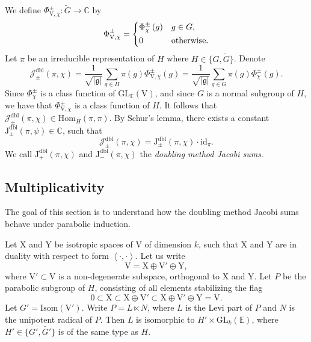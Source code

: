 \documentclass[12pt, reqno]{amsart}
\theoremstyle{definition}
\theoremstyle{definition}
\theoremstyle{definition}
\newcommand{\cComplex}{\mathbb{C}}
\newcommand{\Hom}{\mathrm{Hom}}
\newcommand{\idmap}{\mathrm{id}}
\newcommand{\sizeof}[1]{\left|#1\right|}
\newcommand{\hermitianSpace}{\mathrm{V}}
\newcommand{\xIsotropic}{\mathrm{X}}
\newcommand{\yIsotropic}{\mathrm{Y}}
\newcommand{\innerproduct}[2]{\left\langle #1,#2\right\rangle}
\newcommand{\fieldCharacter}{\psi}
\newcommand{\GL}{\mathrm{GL}}
\newcommand{\GroupExtension}[1]{\widetilde{#1}}
\newcommand{\quadraticExtension}{\mathbb{E}}
\newcommand{\dblJacobiSum}[2]{\mathcal{J}_{\pm}^{\mathrm{dbl}}\left(#1, #2\right)}
\newcommand{\genJacobiKernel}[1]{\Phi^{\pm}_{#1}}
\newcommand{\genHermitianJacobiKernel}[2]{\Phi^{\pm}_{#1,#2}}
\newcommand{\dblJacobiSumScalar}[2]{\mathrm{J}_{\pm}^{\mathrm{dbl}}\left(#1, #2\right)}
\newcommand{\posDblJacobiSumScalar}[2]{\mathrm{J}_{+}^{\mathrm{dbl}}\left(#1, #2\right)}
\newcommand{\negDblJacobiSumScalar}[2]{\mathrm{J}_{-}^{\mathrm{dbl}}\left(#1, #2\right)}
\newcommand{\IsometryGroup}{\mathrm{Isom}}
\newcommand{\lieAlgebra}{\mathfrak{g}}
\begin{document}
We define $\genHermitianJacobiKernel{\hermitianSpace}{\chi} \colon \tilde{G} \to \cComplex$ by $$\genHermitianJacobiKernel{\hermitianSpace}{\chi} =
	\begin{dcases}
		\genJacobiKernel{\chi}\left(g\right) & g \in G,\\
		0 & \text{otherwise.}
	\end{dcases}$$
Let $\pi$ be an irreducible representation of $H$ where $H \in \{G, \GroupExtension{G}\}$. Denote $$\dblJacobiSum{\pi}{\chi} = \frac{1}{\sqrt{\sizeof{\lieAlgebra}}} \sum_{g \in H} \pi\left(g\right) \genHermitianJacobiKernel{\hermitianSpace}{\chi}\left(g\right) = \frac{1}{\sqrt{\sizeof{\lieAlgebra}}} \sum_{g \in G} \pi\left(g\right) \genJacobiKernel{\chi}\left(g\right).$$
Since $\genJacobiKernel{\chi}$ is a class function of $\GL_{\quadraticExtension}\left(\hermitianSpace\right)$, and since $G$ is a normal subgroup of $H$, we have that $\genHermitianJacobiKernel{\hermitianSpace}{\chi}$ is a class function of $H$. It follows that $\dblJacobiSum{\pi}{\chi} \in \Hom_{H}\left(\pi, \pi\right)$. By Schur's lemma, there exists a constant $\dblJacobiSumScalar{\pi}{\fieldCharacter} \in \cComplex$, such that $$\dblJacobiSum{\pi}{\chi} = \dblJacobiSumScalar{\pi}{\chi} \cdot \idmap_\pi.$$
We call $\posDblJacobiSumScalar{\pi}{\chi}$ and $\negDblJacobiSumScalar{\pi}{\chi}$ the \emph{doubling method Jacobi sums}.

\subsection{Multiplicativity}\label{subsec:multiplicativity}
The goal of this section is to understand how the doubling method Jacobi sums behave under parabolic induction.

Let $\xIsotropic$ and $\yIsotropic$ be isotropic spaces of $\hermitianSpace$ of dimension $k$, such that $\xIsotropic$ and $\yIsotropic$ are in duality with respect to form $\innerproduct{\cdot}{\cdot}$. Let us write $$\hermitianSpace = \xIsotropic \oplus \hermitianSpace' \oplus \yIsotropic,$$
where $\hermitianSpace' \subset \hermitianSpace$ is a non-degenerate subspace, orthogonal to $\xIsotropic$ and $\yIsotropic$. Let $P$ be the parabolic subgroup of $H$, consisting of all elements stabilizing the flag $$0 \subset \xIsotropic \subset \xIsotropic \oplus \hermitianSpace' \subset \xIsotropic \oplus \hermitianSpace' \oplus \yIsotropic = \hermitianSpace.$$
Let $G' = \IsometryGroup\left(\hermitianSpace'\right)$. Write $P = L \ltimes N$, where $L$ is the Levi part of $P$ and $N$ is the unipotent radical of $P$. Then $L$ is isomorphic to $H' \times \GL_k\left(\quadraticExtension\right)$, where $H' \in \{G',\GroupExtension{G'}\}$ is of the same type as $H$. 
\end{document}
